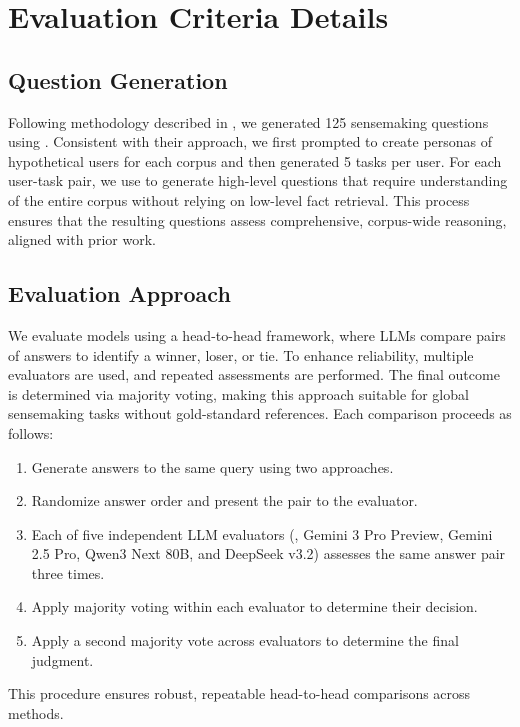 \section{Evaluation Criteria Details} 
\subsection{Question Generation} \label{sec:question_generation}
Following methodology described in \cite{edge24}, we generated 125 sensemaking questions using \five.
Consistent with their approach, we first prompted \five to create personas of hypothetical users for each corpus and then generated 5 tasks per user.  
For each user-task pair, we use \five to generate high-level questions that require understanding of the entire corpus without relying on low-level fact retrieval.  
This process ensures that the resulting questions assess comprehensive, corpus-wide reasoning, aligned with prior work.

\subsection{Evaluation Approach} \label{sec:evaluation_details}
We evaluate models using a head-to-head framework, where LLMs compare pairs of answers to identify a winner, loser, or tie. To enhance reliability, multiple evaluators are used, and repeated assessments are performed. The final outcome is determined via majority voting, making this approach suitable for global sensemaking tasks without gold-standard references.
 Each comparison proceeds as follows:
\begin{enumerate}
\item Generate answers to the same query using two approaches.
\item Randomize answer order and present the pair to the evaluator.
\item Each of five independent LLM evaluators (\five, Gemini 3 Pro Preview, Gemini 2.5 Pro, Qwen3 Next 80B, and DeepSeek v3.2) assesses the same answer pair three times.
\item Apply majority voting within each evaluator to determine their decision.
\item Apply a second majority vote across evaluators to determine the final judgment.
\end{enumerate}
This procedure ensures robust, repeatable head-to-head comparisons across methods.



